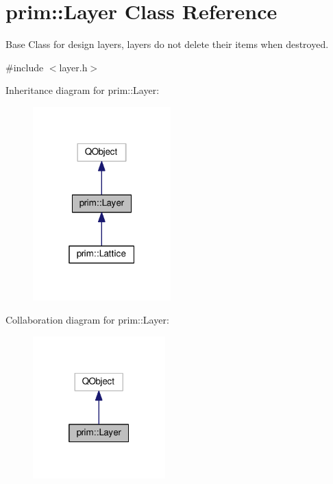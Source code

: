 \hypertarget{classprim_1_1Layer}{}\section{prim\+:\+:Layer Class Reference}
\label{classprim_1_1Layer}


Base Class for design layers, layers do not delete their items when destroyed.  




{\ttfamily \#include $<$layer.\+h$>$}



Inheritance diagram for prim\+:\+:Layer\+:\nopagebreak
\begin{figure}[H]
\begin{center}
\leavevmode
\includegraphics[width=151pt]{classprim_1_1Layer__inherit__graph}
\end{center}
\end{figure}


Collaboration diagram for prim\+:\+:Layer\+:\nopagebreak
\begin{figure}[H]
\begin{center}
\leavevmode
\includegraphics[width=145pt]{classprim_1_1Layer__coll__graph}
\end{center}
\end{figure}
